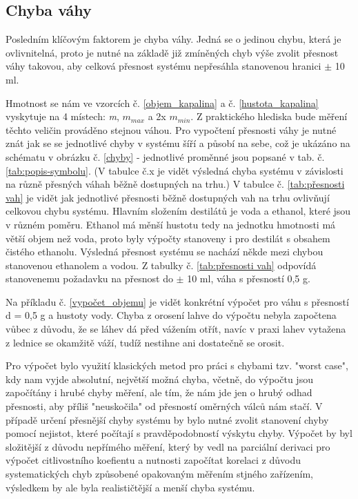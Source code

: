 \subsection{Chyba váhy}
Posledním klíčovým faktorem je chyba váhy. Jedná se o jedinou chybu, která je ovlivnitelná, proto je nutné na základě již zmíněných chyb výše zvolit přesnost váhy takovou, aby celková přesnost systému nepřesáhla stanovenou hranici $\pm$ 10 ml.


Hmotnost se nám ve vzorcích č. \ref{objem_kapalina} a č.  \ref{hustota_kapalina} vyskytuje na 4 místech: \textit{m}, $m_{max}$ a 2x $m_{min}$. Z praktického hlediska bude měření těchto veličin prováděno stejnou váhou. Pro vypočtení přesnosti váhy je nutné znát jak se se jednotlivé chyby v systému šíří a působí na sebe, což je ukázáno na schématu v obrázku č. \ref{chyby} - jednotlivé proměnné jsou popsané v tab. č. \ref{tab:popis-symbolu}. (V tabulce č.x je vidět výsledná chyba systému v závislosti na různě přesných váhah běžně dostupných na trhu.) V tabulce č. \ref{tab:přesnosti vah} je vidět jak jednotlivé přesnosti běžně dostupných vah na trhu ovlivňují celkovou chybu systému. Hlavním složením destilátů je voda a ethanol, které jsou v různém poměru. Ethanol má měnší hustotu tedy na jednotku hmotnosti má větší objem než voda, proto byly výpočty stanoveny i pro destilát s obsahem čistého ethanolu. Výsledná přesnost systému se nachází někde mezi chybou stanovenou ethanolem a vodou. Z tabulky č. \ref{tab:přesnosti vah} odpovídá stanovenemu požadavku na přesnost do $\pm$ 10 ml, váha s přesností 0,5 g. 

Na příkladu č. \ref{vypočet_objemu} je vidět konkrétní výpočet pro váhu s přesností d = 0,5 g a hustoty vody. Chyba z orosení lahve do výpočtu nebyla započtena vůbec z důvodu, že se láhev dá před vážením otřít, navíc v praxi lahev vytažena z lednice se okamžitě váží, tudíž nestihne ani dostatečně se orosit. %

Pro výpočet bylo využití klasických metod pro práci s chybami tzv. "worst case", kdy nam vyjde absolutní, největší možná chyba, včetně, do výpočtu jsou započítány i hrubé chyby měření, ale tím, že nám jde jen o hrubý odhad přesnosti, aby příliš "neuskočila" od přesností oměrných válců nám stačí. V případě určení přesnější chyby systému by bylo nutné zvolit stanovení chyby pomocí nejistot, které počítají s pravděpodobností výskytu chyby. Výpočet by byl složitější z důvodu nepřímého měření, který by vedl na parciální derivaci pro výpočet citlivostního koefientu a nutnosti započítat korelaci z důvodu systematických chyb způsobené opakovaným měřením stjného zařízením, výsledkem by ale byla realističtější a menší chyba systému.

